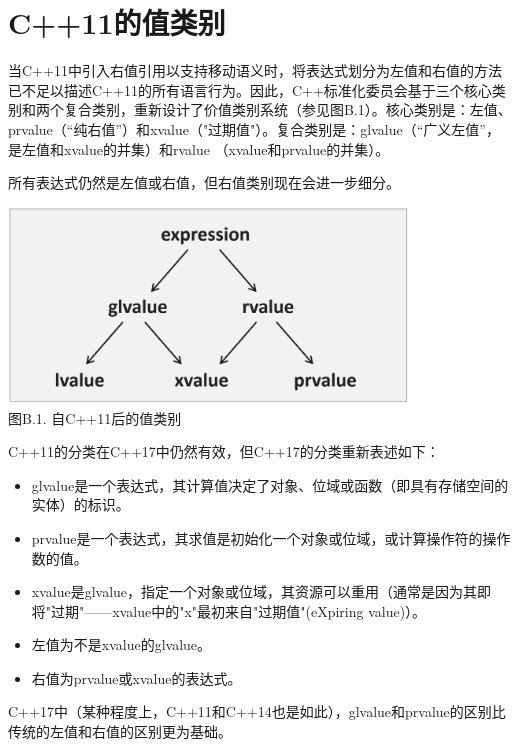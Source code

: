 \section{C++11的值类别}

当C++11中引入右值引用以支持移动语义时，将表达式划分为左值和右值的方法已不足以描述C++11的所有语言行为。因此，C++标准化委员会基于三个核心类别和两个复合类别，重新设计了价值类别系统（参见图B.1）。核心类别是：左值、prvalue（“纯右值”）和xvalue（"过期值"）。复合类别是：glvalue（“广义左值”，是左值和xvalue的并集）和rvalue （xvalue和prvalue的并集）。

所有表达式仍然是左值或右值，但右值类别现在会进一步细分。

\begin{center}
\includegraphics[width=0.8\textwidth]{backmatter/Appendix/B/images/1.png} \\
图B.1. 自C++11后的值类别
\end{center}

C++11的分类在C++17中仍然有效，但C++17的分类重新表述如下：

\begin{itemize}
\item 
glvalue是一个表达式，其计算值决定了对象、位域或函数（即具有存储空间的实体）的标识。

\item 
prvalue是一个表达式，其求值是初始化一个对象或位域，或计算操作符的操作数的值。

\item 
xvalue是glvalue，指定一个对象或位域，其资源可以重用（通常是因为其即将"过期"——xvalue中的"x"最初来自"过期值"(eXpiring value)）。

\item 
左值为不是xvalue的glvalue。

\item 
右值为prvalue或xvalue的表达式。
\end{itemize}

C++17中（某种程度上，C++11和C++14也是如此），glvalue和prvalue的区别比传统的左值和右值的区别更为基础。

